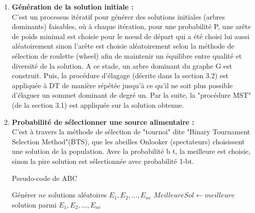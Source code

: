 \begin{enumerate}[label=\alph*)]
	
	\item \textbf{Génération de la solution initiale :}\\
	C’est un processus itératif pour générer des solutions initiales (arbres dominants) faisables, où à chaque itération, pour une probabilité P, une arête de poids minimal est choisie pour le nœud de départ qui a été choisi lui aussi aléatoirement sinon l’arête est choisie aléatoirement selon la méthode de sélection de roulette (wheel) afin de maintenir un équilibre entre qualité et diversité de la solution. A ce stade, un arbre dominant du graphe G est construit. Puis, la procédure d’élagage (décrite dans la section 3.2) est appliquée à DT de manière répétée jusqu’à ce qu’il ne soit plus possible d’élaguer un sommet dominant de degré un. Par la suite, la "procédure MST" (de la section 3.1) est appliquée sur la solution obtenue.

	\item \textbf{Probabilité de sélectionner une source alimentaire :}\\
	C’est à travers la méthode de sélection de "tournoi" dite "Binary Tournament Selection Method"(BTS), que les abeilles Onlooker (spectateurs) choisissent une solution de  la population. Avec la probabilité b t, la meilleure est choisie, sinon la pire solution est sélectionnée avec probabilité 1-bt.\\
	

\begin{algorithm}[H]
\label{alg3:ABC}
\caption{ Pseudo-code de ABC }
\SetAlgoLined
\DontPrintSemicolon

Générer $ne$ solutions aléatoires $E_1 , E_2 , ..., E_{ne}$ \;
$MeilleureSol \gets meilleure $ solution parmi $E_1 , E_2 , ..., E_{ne}$ \;

\end{algorithm}
\end{enumerate}
